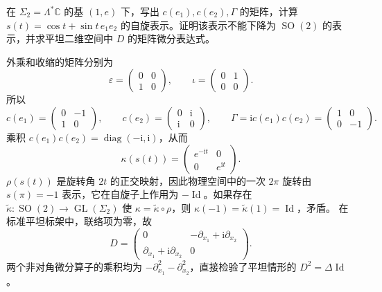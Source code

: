 \begin{optionalexercise}\label{g3:ex:spin-two-half-angle}
	在 \(\Sigma_2=\Lambda^*\mathbb C\) 的基 \((1,e)\) 下，写出 \(c(e_1),c(e_2),\Gamma\) 的矩阵，计算 \(s(t)=\cos t+\sin t\,e_1e_2\) 的自旋表示。证明该表示不能下降为 \(\operatorname{SO}(2)\) 的表示，并求平坦二维空间中 \(D\) 的矩阵微分表达式。
\end{optionalexercise}
\begin{solution}
	外乘和收缩的矩阵分别为
	\[
		\varepsilon=\begin{pmatrix}0&0\\1&0\end{pmatrix},\qquad
		\iota=\begin{pmatrix}0&1\\0&0\end{pmatrix}.
	\]
	所以
	\[
		c(e_1)=\begin{pmatrix}0&-1\\1&0\end{pmatrix},\qquad
		c(e_2)=\begin{pmatrix}0&\mathrm i\\\mathrm i&0\end{pmatrix},\qquad
		\Gamma=\mathrm i c(e_1)c(e_2)=\begin{pmatrix}1&0\\0&-1\end{pmatrix}.
	\]
	乘积 \(c(e_1)c(e_2)=\operatorname{diag}(-\mathrm i,\mathrm i)\)，从而
	\[
		\kappa(s(t))=\begin{pmatrix}e^{-\mathrm it}&0\\0&e^{\mathrm it}\end{pmatrix}.
	\]
	\(\rho(s(t))\) 是旋转角 \(2t\) 的正交映射，因此物理空间中的一次 \(2\pi\) 旋转由 \(s(\pi)=-1\) 表示，它在自旋子上作用为 \(-\operatorname{Id}\)。如果存在 \(\widetilde\kappa:\operatorname{SO}(2)\to\operatorname{GL}(\Sigma_2)\) 使 \(\kappa=\widetilde\kappa\circ\rho\)，则 \(\kappa(-1)=\widetilde\kappa(1)=\operatorname{Id}\)，矛盾。
	在标准平坦标架中，联络项为零，故
	\[
		D=\begin{pmatrix}
			0&-\partial_{x_1}+\mathrm i\partial_{x_2}\\
			\partial_{x_1}+\mathrm i\partial_{x_2}&0
		\end{pmatrix}.
	\]
	两个非对角微分算子的乘积均为 \(-\partial_{x_1}^2-\partial_{x_2}^2\)，直接检验了平坦情形的 \(D^2=\Delta\operatorname{Id}\)。
\end{solution}


